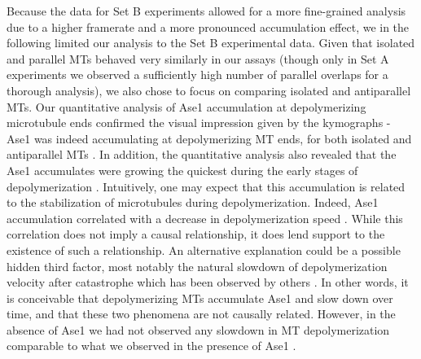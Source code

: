 Because the data for Set B experiments allowed for a more fine-grained analysis due to a higher framerate and a more pronounced accumulation effect, we in the following limited our analysis to the Set B experimental data. Given that isolated and parallel MTs behaved very similarly in our assays (though only in Set A experiments we observed a sufficiently high number of parallel overlaps for a thorough analysis), we also chose to focus on comparing isolated and antiparallel MTs. Our quantitative analysis of Ase1 accumulation at depolymerizing microtubule ends confirmed the visual impression given by the kymographs - Ase1 was indeed accumulating at depolymerizing MT ends, for both isolated and antiparallel MTs . In addition, the quantitative analysis also revealed that the Ase1 accumulates were growing the quickest during the early stages of depolymerization . Intuitively, one may expect that this accumulation is related to the stabilization of microtubules during depolymerization. Indeed, Ase1 accumulation correlated with a decrease in depolymerization speed . While this correlation does not imply a causal relationship, it does lend support to the existence of such a relationship. An alternative explanation could be a possible hidden third factor, most notably the natural slowdown of depolymerization velocity after catastrophe which has been observed by others \parencite{Luchniak2023}. In other words, it is conceivable that depolymerizing MTs accumulate Ase1 and slow down over time, and that these two phenomena are not causally related. However, in the absence of Ase1 we had not observed any slowdown in MT depolymerization comparable to what we observed in the presence of Ase1 . \par

